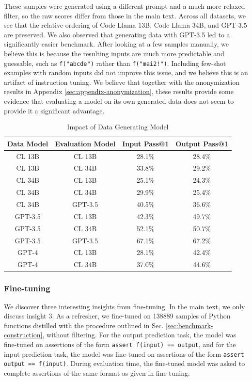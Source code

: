 These samples were generated using a different prompt and a much more relaxed filter, so the raw scores differ from those in the main text. Across all datasets, we see that the relative ordering of Code Llama 13B, Code Llama 34B, and GPT-3.5 are preserved. We also observed that generating data with GPT-3.5 led to a significantly easier benchmark. After looking at a few samples manually, we believe this is because the resulting inputs are much more predictable and guessable, such as \texttt{f("abcde")} rather than \texttt{f("mai2!")}. Including few-shot examples with random inputs did not improve this issue, and we believe this is an artifact of instruction tuning. We believe that together with the anonymization results in Appendix \ref{sec:appendix-anonymization}, these results provide some evidence that evaluating a model on its own generated data does not seem to provide it a significant advantage.


\begin{table}[H]
    \centering
    \caption{Impact of Data Generating Model}
    \begin{tabular}{cccc}
        \toprule
        \textbf{Data Model} & \textbf{Evaluation Model} & \textbf{Input Pass@1} & \textbf{Output Pass@1} \\
        \midrule
        CL 13B & CL 13B & 28.1\% & 28.4\% \\
        CL 13B & CL 34B & 33.8\% & 29.2\% \\
        \midrule
        CL 34B & CL 13B & 25.1\% & 24.3\% \\
        CL 34B & CL 34B & 29.9\% & 25.4\% \\
        CL 34B & GPT-3.5 & 40.5\% & 36.6\% \\
        \midrule
        GPT-3.5 & CL 13B & 42.3\% & 49.7\% \\
        GPT-3.5 & CL 34B & 52.1\% & 50.7\% \\
        GPT-3.5 & GPT-3.5 & 67.1\% & 67.2\% \\
        \midrule
        GPT-4 & CL 13B & 28.1\% & 42.4\% \\
        GPT-4 & CL 34B & 37.0\% & 44.6\% \\
        \bottomrule
    \end{tabular}
    \label{tab:benchmark-results-data-generating}
\end{table}

\subsubsection{Fine-tuning} \label{subsec:appendix-finetuning}
We discover three interesting insights from fine-tuning. In the main text, we only discuss insight 3. As a refresher, we fine-tuned \codellamalarge on 138889 samples of Python functions distilled with the procedure outlined in Sec. \ref{sec:benchmark-construction}, without filtering. For the output prediction task, the model was fine-tuned on assertions of the form \texttt{assert f(input) == output}, and for the input prediction task, the model was fine-tuned on assertions of the form \texttt{assert output == f(input)}. During evaluation time, the fine-tuned model was asked to complete assertions of the same format as given in fine-tuning. 

